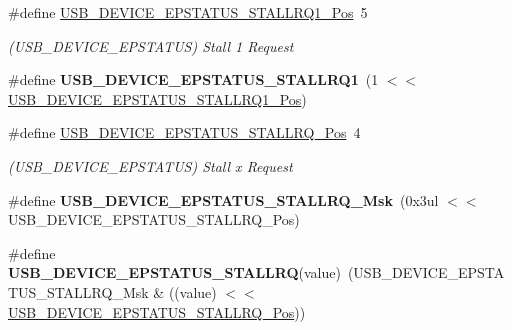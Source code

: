 \begin{DoxyCompactItemize}
\item 
\hypertarget{group___s_a_m_l21___u_s_b_ga427a259500b80b540fdeece18fb2dbc9}{}\#define \hyperlink{group___s_a_m_l21___u_s_b_ga427a259500b80b540fdeece18fb2dbc9}{U\+S\+B\+\_\+\+D\+E\+V\+I\+C\+E\+\_\+\+E\+P\+S\+T\+A\+T\+U\+S\+\_\+\+S\+T\+A\+L\+L\+R\+Q1\+\_\+\+Pos}~5\label{group___s_a_m_l21___u_s_b_ga427a259500b80b540fdeece18fb2dbc9}

\begin{DoxyCompactList}\small\item\em (U\+S\+B\+\_\+\+D\+E\+V\+I\+C\+E\+\_\+\+E\+P\+S\+T\+A\+T\+U\+S) Stall 1 Request \end{DoxyCompactList}\item 
\hypertarget{group___s_a_m_l21___u_s_b_gabcf1b93d94dc5014d0f05efd94569b5e}{}\#define {\bfseries U\+S\+B\+\_\+\+D\+E\+V\+I\+C\+E\+\_\+\+E\+P\+S\+T\+A\+T\+U\+S\+\_\+\+S\+T\+A\+L\+L\+R\+Q1}~(1 $<$$<$ \hyperlink{group___s_a_m_l21___u_s_b_ga427a259500b80b540fdeece18fb2dbc9}{U\+S\+B\+\_\+\+D\+E\+V\+I\+C\+E\+\_\+\+E\+P\+S\+T\+A\+T\+U\+S\+\_\+\+S\+T\+A\+L\+L\+R\+Q1\+\_\+\+Pos})\label{group___s_a_m_l21___u_s_b_gabcf1b93d94dc5014d0f05efd94569b5e}

\item 
\hypertarget{group___s_a_m_l21___u_s_b_ga308eb835ae02db80ff3e0071488cf6e3}{}\#define \hyperlink{group___s_a_m_l21___u_s_b_ga308eb835ae02db80ff3e0071488cf6e3}{U\+S\+B\+\_\+\+D\+E\+V\+I\+C\+E\+\_\+\+E\+P\+S\+T\+A\+T\+U\+S\+\_\+\+S\+T\+A\+L\+L\+R\+Q\+\_\+\+Pos}~4\label{group___s_a_m_l21___u_s_b_ga308eb835ae02db80ff3e0071488cf6e3}

\begin{DoxyCompactList}\small\item\em (U\+S\+B\+\_\+\+D\+E\+V\+I\+C\+E\+\_\+\+E\+P\+S\+T\+A\+T\+U\+S) Stall x Request \end{DoxyCompactList}\item 
\hypertarget{group___s_a_m_l21___u_s_b_ga965ea95e255ba96d94381440af7b9b4f}{}\#define {\bfseries U\+S\+B\+\_\+\+D\+E\+V\+I\+C\+E\+\_\+\+E\+P\+S\+T\+A\+T\+U\+S\+\_\+\+S\+T\+A\+L\+L\+R\+Q\+\_\+\+Msk}~(0x3ul $<$$<$ U\+S\+B\+\_\+\+D\+E\+V\+I\+C\+E\+\_\+\+E\+P\+S\+T\+A\+T\+U\+S\+\_\+\+S\+T\+A\+L\+L\+R\+Q\+\_\+\+Pos)\label{group___s_a_m_l21___u_s_b_ga965ea95e255ba96d94381440af7b9b4f}

\item 
\hypertarget{group___s_a_m_l21___u_s_b_ga3749499038415e0f255f21156631b074}{}\#define {\bfseries U\+S\+B\+\_\+\+D\+E\+V\+I\+C\+E\+\_\+\+E\+P\+S\+T\+A\+T\+U\+S\+\_\+\+S\+T\+A\+L\+L\+R\+Q}(value)~(U\+S\+B\+\_\+\+D\+E\+V\+I\+C\+E\+\_\+\+E\+P\+S\+T\+A\+T\+U\+S\+\_\+\+S\+T\+A\+L\+L\+R\+Q\+\_\+\+Msk \& ((value) $<$$<$ \hyperlink{group___s_a_m_l21___u_s_b_ga308eb835ae02db80ff3e0071488cf6e3}{U\+S\+B\+\_\+\+D\+E\+V\+I\+C\+E\+\_\+\+E\+P\+S\+T\+A\+T\+U\+S\+\_\+\+S\+T\+A\+L\+L\+R\+Q\+\_\+\+Pos}))\label{group___s_a_m_l21___u_s_b_ga3749499038415e0f255f21156631b074}


\end{DoxyCompactItemize}
